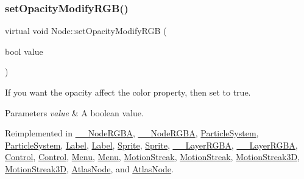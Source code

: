 \mbox{\label{classNode_a03297671eb3440831666a3aa25875f1d}} 
\subsubsection{\texorpdfstring{set\+Opacity\+Modify\+R\+G\+B()}{setOpacityModifyRGB()}\hspace{0.1cm}{\footnotesize\ttfamily [2/2]}}
{\footnotesize\ttfamily virtual void Node\+::set\+Opacity\+Modify\+R\+GB (\begin{DoxyParamCaption}\item[{bool}]{value }\end{DoxyParamCaption})\hspace{0.3cm}{\ttfamily [virtual]}}

If you want the opacity affect the color property, then set to true. 
\begin{DoxyParams}{Parameters}
{\em value} & A boolean value. \\
\hline
\end{DoxyParams}


Reimplemented in \hyperlink{class____NodeRGBA_a2baa7449894e58c0bc78e749058b9c0e}{\+\_\+\+\_\+\+Node\+R\+G\+BA}, \hyperlink{class____NodeRGBA_a2baa7449894e58c0bc78e749058b9c0e}{\+\_\+\+\_\+\+Node\+R\+G\+BA}, \hyperlink{classParticleSystem_a2c5a931c70aaa80e3fc098ec0aaf9827}{Particle\+System}, \hyperlink{classParticleSystem_a2c5a931c70aaa80e3fc098ec0aaf9827}{Particle\+System}, \hyperlink{classLabel_a29fe05b89ed819988763ae013ca8fe48}{Label}, \hyperlink{classLabel_ab548565b1faa8449ced97d96a591e955}{Label}, \hyperlink{classSprite_a4b86bd0afb6fa3bb3ed5521041800458}{Sprite}, \hyperlink{classSprite_adf41c2705eb6b1317a14c469c84da78c}{Sprite}, \hyperlink{class____LayerRGBA_a04037a60b1a1f9d5ba2760252ad2da35}{\+\_\+\+\_\+\+Layer\+R\+G\+BA}, \hyperlink{class____LayerRGBA_a04037a60b1a1f9d5ba2760252ad2da35}{\+\_\+\+\_\+\+Layer\+R\+G\+BA}, \hyperlink{classControl_afc69bf17ee302a8efd9db70d5bb4c5b7}{Control}, \hyperlink{classControl_ad2bebed567807e1e309513666f67ad5e}{Control}, \hyperlink{classMenu_ae2979f44049f67f2a2411cb3901842ef}{Menu}, \hyperlink{classMenu_a7dc62dd40fb8b6cd4addee5fb38cb6b9}{Menu}, \hyperlink{classMotionStreak_a03e92253595f528d79528bbb4be1b2ad}{Motion\+Streak}, \hyperlink{classMotionStreak_aa140ca21b82d41fbe8c0ba08d8060c3b}{Motion\+Streak}, \hyperlink{classMotionStreak3D_ad201e04b841b5fb15fea56bfd6b9cb03}{Motion\+Streak3D}, \hyperlink{classMotionStreak3D_ac4ef49b3087c63f5cea40efe91d4f271}{Motion\+Streak3D}, \hyperlink{classAtlasNode_ab9dacc4ad5e4701ff0a531605f2d1f11}{Atlas\+Node}, and \hyperlink{classAtlasNode_adb5151b64bb92b157133f9efb07124a8}{Atlas\+Node}.

